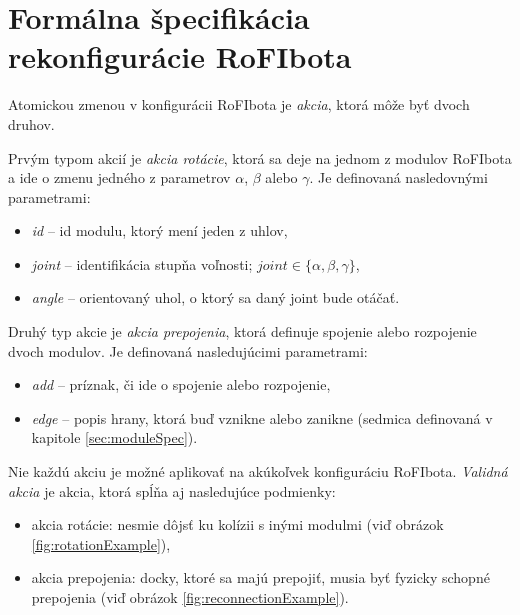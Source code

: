 \documentclass[
  digital, %
  oneside, %
  table,   %
  lof,     %
  nolot,     %
]{fithesis3}
\begin{document}
\section{Formálna špecifikácia rekonfigurácie RoFIbota}
\label{sec:formalRecfg}
Atomickou zmenou v konfigurácii RoFIbota je \textit{akcia}, ktorá môže byť dvoch druhov. 

Prvým typom akcií je \textit{akcia rotácie}, ktorá sa deje na jednom z modulov RoFIbota a ide o zmenu jedného z parametrov $\alpha$, $\beta$ alebo $\gamma$. Je definovaná nasledovnými parametrami: 
\begin{itemize}
    \item \textit{id} -- id modulu, ktorý mení jeden z uhlov, 
    \item \textit{joint} -- identifikácia stupňa voľnosti; $joint \in \{\alpha, \beta, \gamma\}$, 
    \item \textit{angle} -- orientovaný uhol, o ktorý sa daný joint bude otáčať. 
\end{itemize}

Druhý typ akcie je \textit{akcia prepojenia}, ktorá definuje spojenie alebo rozpojenie dvoch modulov. Je definovaná nasledujúcimi parametrami: 
\begin{itemize}
    \item \textit{add} -- príznak, či ide o spojenie alebo rozpojenie,
    \item \textit{edge} -- popis hrany, ktorá buď vznikne alebo zanikne (sedmica definovaná v kapitole \ref{sec:moduleSpec}). 
\end{itemize}

Nie každú akciu je možné aplikovať na akúkoľvek konfiguráciu RoFIbota. \textit{Validná akcia} je akcia, ktorá spĺňa aj nasledujúce podmienky:
\begin{itemize}
    \item akcia rotácie: nesmie dôjsť ku kolízii s inými modulmi (viď obrázok \ref{fig:rotationExample}), 
    \item akcia prepojenia: docky, ktoré sa majú prepojiť, musia byť fyzicky schopné prepojenia (viď obrázok \ref{fig:reconnectionExample}). 
\end{itemize}
\end{document}

